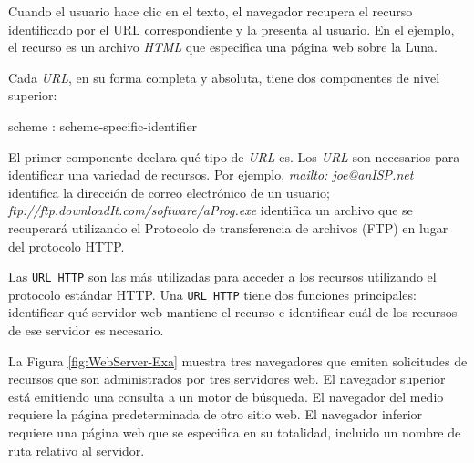 \begin{itemize}
	Cuando el usuario hace clic en el texto, el navegador recupera el recurso identificado por el URL correspondiente y la presenta al usuario. En el ejemplo, el recurso es un archivo \textit{HTML}  que especifica una página web sobre la Luna.
	
	
	
	
	Cada \textit{URL}, en su forma completa y absoluta, tiene dos componentes de nivel superior:
	
	
	
	\begin{kaobox}[frametitle=Componentes URL]
		scheme : scheme-specific-identifier
	\end{kaobox}
	
	El primer componente declara qué tipo de \textit{URL} es. Los \textit{URL} son necesarios para identificar una variedad de recursos. Por ejemplo, \textit{mailto: joe@anISP.net}	identifica la dirección de correo electrónico de un usuario; \textit{ftp://ftp.downloadIt.com/software/aProg.exe} identifica
	un archivo que se recuperará utilizando el Protocolo de transferencia de archivos (FTP) en lugar del	protocolo HTTP.  
	
	Las \texttt{URL HTTP} son las más utilizadas para acceder a los recursos utilizando el protocolo estándar HTTP. 
	Una \texttt{URL HTTP} tiene dos funciones principales: identificar qué servidor web mantiene el recurso e identificar cuál de los recursos de ese servidor es necesario.
	
	La Figura \ref{fig:WebServer-Exa} muestra tres navegadores que emiten solicitudes de recursos que son administrados por tres servidores web. El navegador superior está emitiendo una consulta a un motor de búsqueda. El navegador del medio requiere la página predeterminada de otro sitio web. El navegador inferior requiere una p\'agina web  que se especifica en su totalidad, incluido un nombre de ruta relativo al servidor.  
	

\end{itemize}
